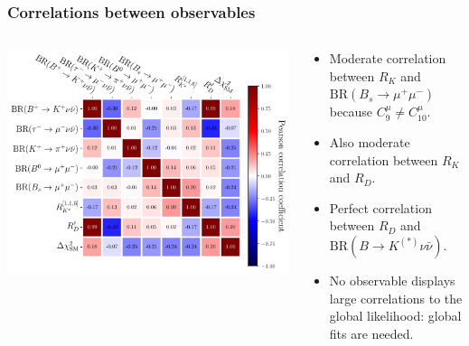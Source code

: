 \documentclass[mathserif, 10pt]{beamer}
\begin{document}
\begin{frame}
    \frametitle{Correlations between observables}

    \begin{columns}[onlytextwidth]
        \begin{column}{0.6\textwidth}
            \includegraphics[width=\columnwidth]{figures/obscorr.pdf}
        \end{column}
        \begin{column}{0.4\textwidth}
            \begin{itemize}
                \item Moderate correlation between $R_K$ and $\mathrm{BR}(B_s \to \mu^+ \mu^-)$ because $C_9^\mu \neq C_{10}^\mu$.
                \item Also moderate correlation between $R_K$ and $R_D$.
                \item Perfect correlation between $R_D$ and $\mathrm{BR}(B\to K^{(*)}\nu\bar{\nu})$.
                \item No observable displays large correlations to the global likelihood: global fits are needed.
            \end{itemize}
        \end{column}
    \end{columns}

\end{frame}
\end{document}
